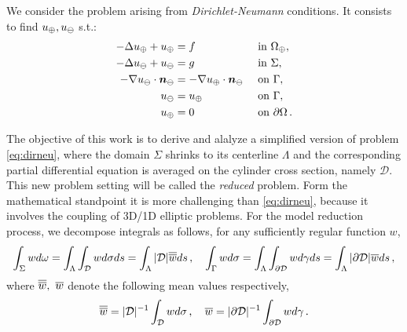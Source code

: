 \documentclass[r]{siamart171218}
\begin{document}
We consider the problem arising from \emph{Dirichlet-Neumann} conditions. 
It consists to find $u_{\oplus},u_{\ominus}$ s.t.:
\begin{subequations}\label{eq:dirneu}
\begin{align}
\label{eq:dirneu1}
- \Delta \up  + \up &= f  && \text{ in } \Omega_{\oplus},\\
\label{eq:dirneu2}
- \Delta \uf  + \uf &= g  && \text{ in } \Sigma,\\
\label{eq:dirneu3}
-\nabla \uf \cdot \nn_{\ominus} &= -\nabla \up \cdot \nn_{\ominus}  && \text{ on } \Gamma,\\
\label{eq:dirneu4}
\uf &= \up && \text{ on }  \Gamma,\\
\label{eq:dirneu5}
\up &= 0 && \text{ on } \partial \Omega\,.
\end{align}
\end{subequations}

The objective of this work is to derive and alalyze a simplified version of problem \eqref{eq:dirneu}, where the domain $\Sigma$ shrinks to its centerline $\Lambda$ and the corresponding partial differential equation is averaged on the cylinder cross section, namely $\mathcal{D}$. This new problem setting will be called the \emph{reduced} problem. Form the mathematical standpoint it is more challenging than \eqref{eq:dirneu}, because it involves the coupling of 3D/1D elliptic problems.
For the model reduction process, we decompose integrals as follows, for any sufficiently regular function $w$,
\begin{equation*}
\int_\Sigma w d\omega 
= \int_\Lambda \int_{\mathcal{D}} w d\sigma ds
= \int_\Lambda |\mathcal{D}|\overline{\overline{w}} ds\,,
\quad
\int_{\Gamma} w d\sigma 
= \int_\Lambda \int_{\partial\mathcal{D}} w d\gamma ds
= \int_\Lambda  |\partial \mathcal{D}| \overline{w} ds\,,
\end{equation*}
where $\overline{\overline{w}}, \ \overline{w}$ denote the following mean values respectively,
\begin{equation*}
\overline{\overline{w}} = |\mathcal{D}|^{-1} \int_{\mathcal{D}} w d\sigma\,,
\quad
\overline{w} = |\partial\mathcal{D}|^{-1} \int_{\partial\mathcal{D}} w d\gamma\,.
\end{equation*}
\end{document}
